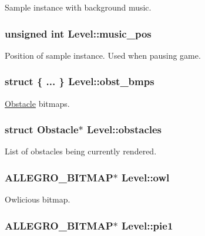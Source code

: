\-Sample instance with background music. \hypertarget{structLevel_a13e322deb3298846260af31324e5b492}{
\subsubsection[{music\-\_\-pos}]{\setlength{\rightskip}{0pt plus 5cm}unsigned int {\bf \-Level\-::music\-\_\-pos}}}\label{structLevel_a13e322deb3298846260af31324e5b492}
\-Position of sample instance. \-Used when pausing game. \hypertarget{structLevel_aeb52cb0b931eae0233dd1b50f2c02bf2}{
\subsubsection[{obst\-\_\-bmps}]{\setlength{\rightskip}{0pt plus 5cm}struct \{ ... \}   {\bf \-Level\-::obst\-\_\-bmps}}}\label{structLevel_aeb52cb0b931eae0233dd1b50f2c02bf2}
\hyperlink{structObstacle}{\-Obstacle} bitmaps. \hypertarget{structLevel_a4b4ac826580c681b588dae8ae0dde418}{
\subsubsection[{obstacles}]{\setlength{\rightskip}{0pt plus 5cm}struct {\bf \-Obstacle}$\ast$ {\bf \-Level\-::obstacles}}}\label{structLevel_a4b4ac826580c681b588dae8ae0dde418}
\-List of obstacles being currently rendered. \hypertarget{structLevel_af504e3f628040bc2a2913a50253e856d}{
\subsubsection[{owl}]{\setlength{\rightskip}{0pt plus 5cm}\-A\-L\-L\-E\-G\-R\-O\-\_\-\-B\-I\-T\-M\-A\-P$\ast$ {\bf \-Level\-::owl}}}\label{structLevel_af504e3f628040bc2a2913a50253e856d}
\-Owlicious bitmap. \hypertarget{structLevel_acf777bae2b7533d8eda0d9766ea402df}{
\subsubsection[{pie1}]{\setlength{\rightskip}{0pt plus 5cm}\-A\-L\-L\-E\-G\-R\-O\-\_\-\-B\-I\-T\-M\-A\-P$\ast$ {\bf \-Level\-::pie1}}}\label{structLevel_acf777bae2b7533d8eda0d9766ea402df}
